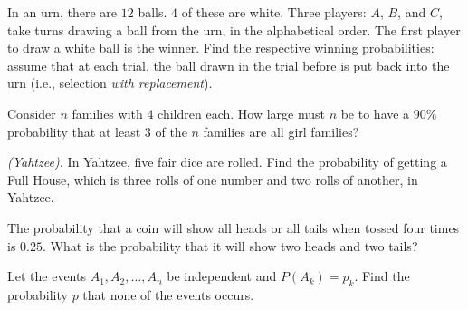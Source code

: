 \begin{problem}[Handout 5, \# 2]
  In an urn, there are \(12\) balls. \(4\) of these are white. Three
  players: \(A\), \(B\), and \(C\), take turns drawing a ball from the urn,
  in the alphabetical order. The first player to draw a white ball is the
  winner. Find the respective winning probabilities: assume that at each
  trial, the ball drawn in the trial before is put back into the urn (i.e.,
  selection \emph{with replacement}).
\end{problem}
\begin{solution}
\end{solution}
\newpage

\begin{problem}[Handout 5, \# 8]
  Consider \(n\) families with \(4\) children each. How large must \(n\) be
  to have a \(90\%\) probability that at least \(3\) of the \(n\) families
  are all girl families?
\end{problem}
\begin{solution}

\end{solution}
\newpage

\begin{problem}[Handout 5, \# 10]
  \emph{(Yahtzee).} In Yahtzee, five fair dice are rolled. Find the
  probability of getting a Full House, which is three rolls of one number
  and two rolls of another, in Yahtzee.
\end{problem}
\begin{solution}

\end{solution}
\newpage

\begin{problem}[Handout 5, \# 12]
  The probability that a coin will show all heads or all tails when tossed
  four times is \(0.25\). What is the probability that it will show two
  heads and two tails?
\end{problem}
\begin{solution}

\end{solution}
\newpage

\begin{problem}[Handout 5, \# 13]
\end{problem}
\begin{solution}
  Let the events \(A_1, A_2,\dotsc,A_n\) be independent and
  \(P(A_k)=p_k\). Find the probability \(p\) that none of the events
  occurs.
\end{solution}
\newpage

